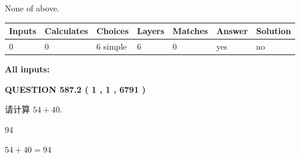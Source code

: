 \documentclass{ctexart}
\begin{document}
 
 None of above.
 
 
\noindent{}
 
 
   
   
   
   
\noindent\begin{tabular}{|l|l|l|l|l|l|l|}
 \hline
Inputs & Calculates & Choices & Layers & Matches & Answer & Solution \\ \hline
 0  & 
 0  & 
 6
  simple  
  & 
 6  & 
 0  & 
  yes & 
  no 
  \\ \hline
 \end{tabular}
   
   
   
   
\noindent{}
   
   
   
   
\noindent\vspace{0.1in}\hspace{-0.08in} {\textbf{\Large{All inputs: }}}
   
   
  
\vspace{0.2in}
  
{\textbf{\Large{QUESTION
587.2 
 ( 1 , 1 , 6791 )
}}}
  
  
 
请计算 $ %
54 +  %
40 $.
 
 
 
\noindent{}
 
 

94
 
 
\noindent{}
 
 

 
 
 
\noindent{}
 
 

$ %
54 +  %
40=   %
94$
 
 
\noindent{}
 
 

 
   
   
   
\end{document}
